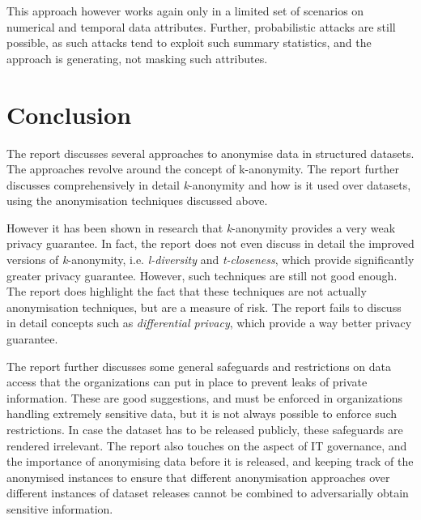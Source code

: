 \documentclass[11pt, a4paper]{article}
\begin{document}
This approach however works again only in a limited set of scenarios on numerical and temporal data attributes. Further, probabilistic attacks\cite{surveyattacks} are still possible, as such attacks tend to exploit such summary statistics, and the approach is generating, not masking such attributes.

\section{Conclusion}

The report discusses several approaches to anonymise data in structured datasets. The approaches revolve around the concept of k-anonymity. The report further discusses comprehensively in detail \textit{k}-anonymity and how is it used over datasets, using the anonymisation techniques discussed above.

However it has been shown in research that \textit{k}-anonymity provides a very weak privacy guarantee. In fact, the report does not even discuss in detail the improved versions of \textit{k}-anonymity, i.e. \textit{l-diversity} and \textit{t-closeness}, which provide significantly greater privacy guarantee. However, such techniques are still not good enough. The report does highlight the fact that these techniques are not actually anonymisation techniques, but are a measure of risk. The report fails to discuss in detail concepts such as \textit{differential privacy}, which provide a way better privacy guarantee.

The report further discusses some general safeguards and restrictions on data access that the organizations can put in place to prevent leaks of private information. These are good suggestions, and must be enforced in organizations handling extremely sensitive data, but it is not always possible to enforce such restrictions. In case the dataset has to be released publicly, these safeguards are rendered irrelevant. The report also touches on the aspect of IT governance, and the importance of anonymising data before it is released, and keeping track of the anonymised instances to ensure that different anonymisation approaches over different instances of dataset releases cannot be combined to adversarially obtain sensitive information.



\end{document}
